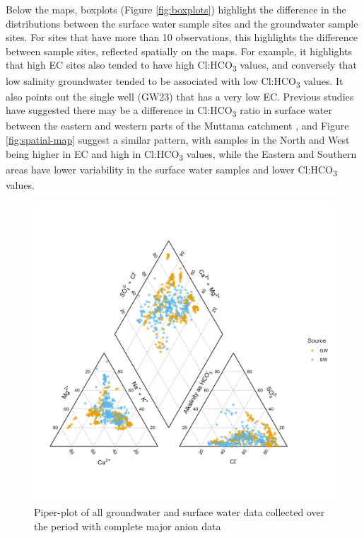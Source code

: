 \documentclass[, manuscript]{copernicus}
\begin{document}
Below the maps, boxplots (Figure \ref{fig:boxplots}) highlight the
difference in the distributions between the surface water sample sites
and the groundwater sample sites. For sites that have more than 10
observations, this highlights the difference between sample sites,
reflected spatially on the maps. For example, it highlights that high EC
sites also tended to have high Cl:HCO\textsubscript{3} values, and
conversely that low salinity groundwater tended to be associated with
low Cl:HCO\textsubscript{3} values. It also points out the single well
(GW23) that has a very low EC. Previous studies have suggested there may
be a difference in Cl:HCO\textsubscript{3} ratio in surface water
between the eastern and western parts of the Muttama catchment
\citep{Conyers2008}, and Figure \ref{fig:spatial-map} suggest a similar
pattern, with samples in the North and West being higher in EC and high
in Cl:HCO\textsubscript{3} values, while the Eastern and Southern areas
have lower variability in the surface water samples and lower
Cl:HCO\textsubscript{3} values.

\begin{figure}
\includegraphics[width=1\linewidth]{Figures/piper_plot} \caption{Piper-plot of all groundwater and surface water data collected over the period with complete major anion data}\label{fig:piperplot}
\end{figure}
\end{document}
